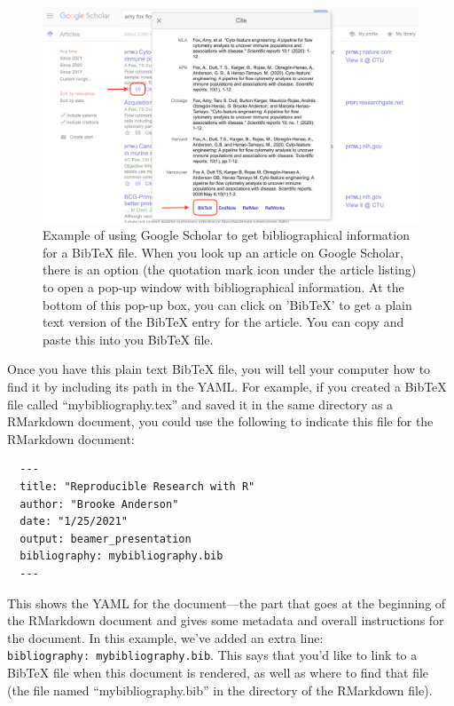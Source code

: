 \documentclass[]{tufte-book}
\begin{document}
\begin{figure}
\includegraphics[width=\textwidth]{figures/google_scholar} \caption[Example of using Google Scholar to get bibliographical information for a BibTeX file]{Example of using Google Scholar to get bibliographical information for a BibTeX file. When you look up an article on Google Scholar, there is an option (the quotation mark icon under the article listing) to open a pop-up window with bibliographical information. At the bottom of this pop-up box, you can click on 'BibTeX' to get a plain text version of the BibTeX entry for the article. You can copy and paste this into you BibTeX file.}\label{fig:googlebibtex}
\end{figure}

Once you have this plain text BibTeX file, you will tell your computer how to
find it by including its path in the YAML. For example, if you created a BibTeX
file called ``mybibliography.tex'' and saved it in the same directory as a
RMarkdown document, you could use the following to indicate this file for
the RMarkdown document:

\begin{verbatim}
  ---
  title: "Reproducible Research with R"
  author: "Brooke Anderson"
  date: "1/25/2021"
  output: beamer_presentation
  bibliography: mybibliography.bib
  ---
\end{verbatim}

This shows the YAML for the document---the part that goes at the beginning of
the RMarkdown document and gives some metadata and overall instructions for the
document. In this example, we've added an extra line: \texttt{bibliography:\ mybibliography.bib}. This says that you'd like to link to a BibTeX file when
this document is rendered, as well as where to find that file (the file named
``mybibliography.bib'' in the directory of the RMarkdown file).
\end{document}

